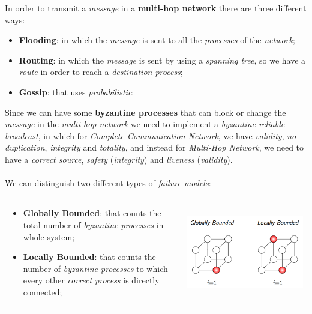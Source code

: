 \documentclass{article}
\begin{document}
In order to transmit a \emph{message} in a \textbf{multi-hop network} there are three different ways:
\begin{itemize}
\item \textbf{Flooding}: in which the \emph{message} is sent to all the \emph{processes} of the \emph{network};
\item \textbf{Routing}: in which the \emph{message} is sent by using a \emph{spanning tree}, so we have a \emph{route} in order to reach a \emph{destination process};
\item \textbf{Gossip}: that uses \emph{probabilistic};
\end{itemize}
Since we can have some \textbf{byzantine processes} that can block or change the \emph{message} in the\emph{ multi-hop network} we need to implement a \emph{byzantine reliable broadcast}, in which for \emph{Complete Communication Network}, we have \emph{validity}, \emph{no duplication}, \emph{integrity} and \emph{totality}, and instead for \emph{Multi-Hop Network}, we need to have a \emph{correct source}, \emph{safety} (\emph{integrity}) and \emph{liveness} (\emph{validity}).\\\\
We can distinguish two different types of \emph{failure models}:\\
\begin{tabular}{C{8cm}  L{10.5cm}}
  \begin{itemize}
  \item \textbf{Globally Bounded}: that counts the total number of \emph{byzantine processes} in whole system;
  \item \textbf{Locally Bounded}: that counts the number of \emph{byzantine processes} to which every other \emph{correct process} is directly connected;
  \end{itemize} & \includegraphics[scale=0.8]{cattura94.png}
\end{tabular}\\\\
\end{document}
